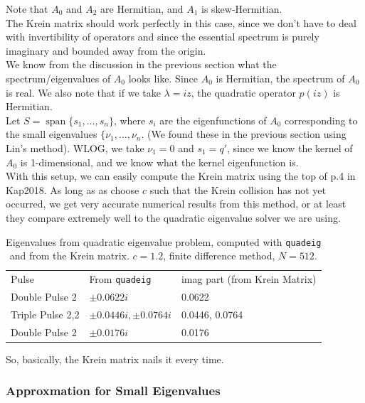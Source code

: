 \documentclass[12pt]{article}
\DeclareMathOperator{\spn}{span}
\begin{document}
Note that $A_0$ and $A_2$ are Hermitian, and $A_1$ is skew-Hermitian.\\

The Krein matrix should work perfectly in this case, since we don't have to deal with invertibility of operators and since the essential spectrum is purely imaginary and bounded away from the origin.\\

We know from the discussion in the previous section what the spectrum/eigenvalues of $A_0$ looks like. Since $A_0$ is Hermitian, the spectrum of $A_0$ is real. We also note that if we take $\lambda = i z$, the quadratic operator $p(iz)$ is Hermitian.
\\

Let $S = \spn\{s_1, \dots, s_n \}$, where $s_i$ are the eigenfunctions of $A_0$ corresponding to the small eigenvalues $\{\nu_1, \dots, \nu_n$. (We found these in the previous section using Lin's method). WLOG, we take $\nu_1 = 0$ and $s_1 = q'$, since we know the kernel of $A_0$ is 1-dimensional, and we know what the kernel eigenfunction is.\\

With this setup, we can easily compute the Krein matrix using the top of p.4 in Kap2018. As long as as choose $c$ such that the Krein collision has not yet occurred, we get very accurate numerical results from this method, or at least they compare extremely well to the quadratic eigenvalue solver we are using. 

\begin{table}[H]
\begin{tabular}{lll}
Pulse & From \texttt{quadeig} & imag part (from Krein Matrix) \\
Double Pulse 2    & $\pm 0.0622i$ & 0.0622 \\
Triple Pulse 2,2  & $\pm 0.0446i, \pm 0.0764i$ & 0.0446, 0.0764 \\
Double Pulse 2    & $\pm 0.0176i$ & 0.0176 \\
\end{tabular}
\caption{Eigenvalues from quadratic eigenvalue problem, computed with \texttt{quadeig} and from the Krein matrix. $c = 1.2$, finite difference method, $N = 512$. }
\end{table}

So, basically, the Krein matrix nails it every time.\\

\subsubsection{Approxmation for Small Eigenvalues}
\end{document}
